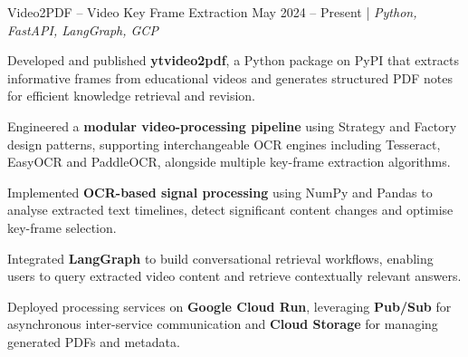 \resumeSubheadings
{Video2PDF -- Video Key Frame Extraction }
{May 2024 -- Present}
{}{}{| \textit{Python, FastAPI, LangGraph, GCP}}
\resumeItemListStart

\item Developed and published \textbf{ytvideo2pdf}, a Python package on PyPI that extracts informative frames from educational videos and generates structured PDF notes for efficient knowledge retrieval and revision.

\item Engineered a \textbf{modular video-processing pipeline} using Strategy and Factory design patterns, supporting interchangeable OCR engines including Tesseract, EasyOCR and PaddleOCR, alongside multiple key-frame extraction algorithms.

\item Implemented \textbf{OCR-based signal processing} using NumPy and Pandas to analyse extracted text timelines, detect significant content changes and optimise key-frame selection.

\item Integrated \textbf{LangGraph} to build conversational retrieval workflows, enabling users to query extracted video content and retrieve contextually relevant answers.

\item Deployed processing services on \textbf{Google Cloud Run}, leveraging \textbf{Pub/Sub} for asynchronous inter-service communication and \textbf{Cloud Storage} for managing generated PDFs and metadata.

\resumeItemListEnd